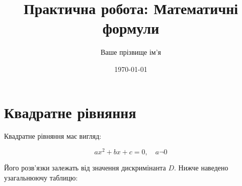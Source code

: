 \documentclass[12pt]{article} %
\title{Практична робота: Математичні формули}
\author{Ваше прізвище ім'я}
\date{\today}
\begin{document}
\maketitle %
 \section* {Квадратне рівняння}  

Квадратне рівняння має вигляд:

\begin{equation}
ax^2 + bx + c = 0, \quad a \neg 0
\end{equation}

Його розв'язки залежать від значення дискримінанта $D$. Нижче наведено узагальнюючу таблицю:
\end{document}
